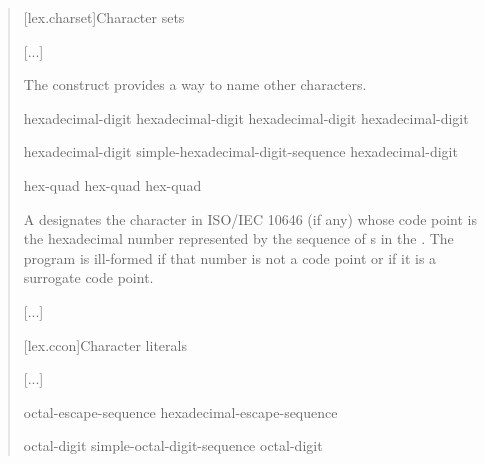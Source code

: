 \documentclass{wg21}
\begin{document}
\begin{quote}
    
    [lex.charset]{Character sets}
    
    [...]    
    
    \pnum
    The  construct provides a way to name
    other characters.
    
    \begin{bnf}
        \br
        hexadecimal-digit hexadecimal-digit hexadecimal-digit hexadecimal-digit
    \end{bnf}

    \begin{addedblock}
    \begin{bnf}
        \br
        hexadecimal-digit\br
        simple-hexadecimal-digit-sequence hexadecimal-digit\br
    \end{bnf}
    \end{addedblock}
    
    \begin{bnf}
        \br
         hex-quad\br
         hex-quad hex-quad\br
    \end{bnf}
    
    
    A 
    designates the character in ISO/IEC 10646 (if any)
    whose code point is the hexadecimal number represented by
    the sequence of s
    in the .
    The program is ill-formed if that number is not a code point
    or if it is a surrogate code point.
    
    [...]
    
    [lex.ccon]{Character literals}
    
    [...]
    
    \begin{bnf}
        \br
        octal-escape-sequence\br
        hexadecimal-escape-sequence
    \end{bnf}

    \begin{addedblock}
        \begin{bnf}
            \br
            octal-digit\br
            simple-octal-digit-sequence octal-digit
        \end{bnf}
    \end{addedblock}
    

\end{quote}
\end{document}
